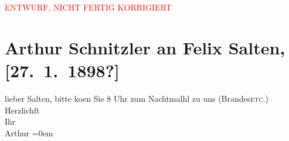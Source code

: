 
\begin{center}
            \textcolor{red}{ENTWURF, NICHT FERTIG KORRIGIERT}
                      \end{center}
            
         
         \renewcommand{\erwaehntePersonen}{Personen: Georg Brandes, Felix Salten}
         \renewcommand{\erwaehnteOrte}{Orte: Wien}
         \renewcommand{\erwaehnteWerke}{}
               \section[Arthur Schnitzler an Felix Salten, {[}27. 1. 1898?{]}]{ Arthur Schnitzler an Felix Salten, {[}27. 1. 1898?{]}}\nopagebreak{}\rehead{ }\begin{ledgroupsized}[t]{13cm}\normalsize\beginnumbering \toendnotes[C]{\smallbreak\pagebreak[2]} 
\toendnotes[C]{\smallbreak}\pstart
           \noindent{}{\pb}lieber Salten, bitte ko{\geminationm}en Sie \label{K_L03034-55v}\label{K_L03034-55h} 8 Uhr zum Nachtmalhl {\pb}zu uns (Brandes\textsc{etc.}) \pend
           \pstart
           Herzlichſt{\\[\baselineskip]}Ihr{\\[\baselineskip]}\spacefill\mbox{Arthur}\pend
           \leftskip=0em{}
         
         \endnumbering{}\end{ledgroupsized}\begin{anhang}\end{anhang}\newcommand{\dateiname}{L03034}\newcommand{\titel}{Arthur Schnitzler an Felix Salten, [27. 1. 1898?]}\newcommand{\editorInnen}{Martin Anton Müller und Laura Untner}
      